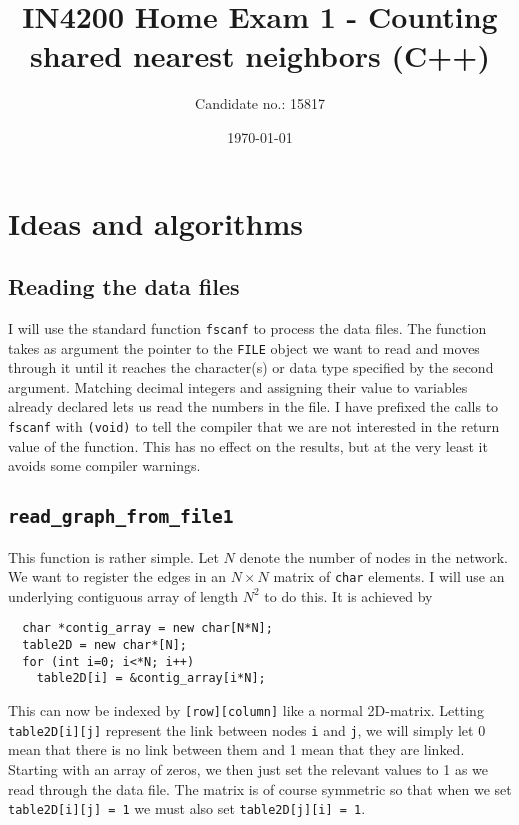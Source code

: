 \documentclass[reprint, english,notitlepage,nofootinbib]{revtex4-1}  %
\begin{document}
\title{IN4200 Home Exam 1 - Counting shared nearest neighbors (C++)}
\date{\today}
\author{Candidate no.: 15817}


\newpage

\maketitle                                %


\section{Ideas and algorithms}

\subsection{Reading the data files}

I will use the standard function \verb|fscanf| to process the data files. The function takes as argument the pointer to the \verb|FILE| object we want to read and moves through it until it reaches the character(s) or data type specified by the second argument. Matching decimal integers and assigning their value to variables already declared lets us read the numbers in the file. I have prefixed the calls to \verb|fscanf| with \verb|(void)| to tell the compiler that we are not interested in the return value of the function. This has no effect on the results, but at the very least it avoids some compiler warnings.


\subsection{\texttt{read\_graph\_from\_file1}} \label{sect:read1}

This function is rather simple. Let \(N\) denote the number of nodes in the network. We want to register the edges in an \(N \times N\) matrix of \verb|char| elements. I will use an underlying contiguous array of length \(N^2\) to do this. It is achieved by
\begin{verbatim}
  char *contig_array = new char[N*N];
  table2D = new char*[N];
  for (int i=0; i<*N; i++)
    table2D[i] = &contig_array[i*N];
\end{verbatim}
This can now be indexed by \verb|[row][column]| like a normal 2D-matrix. Letting \verb|table2D[i][j]| represent the link between nodes \verb|i| and \verb|j|, we will simply let 0 mean that there is no link between them and 1 mean that they are linked. Starting with an array of zeros, we then just set the relevant values to 1 as we read through the data file. The matrix is of course symmetric so that when we set \verb|table2D[i][j] = 1| we must also set \verb|table2D[j][i] = 1|.
\end{document}
